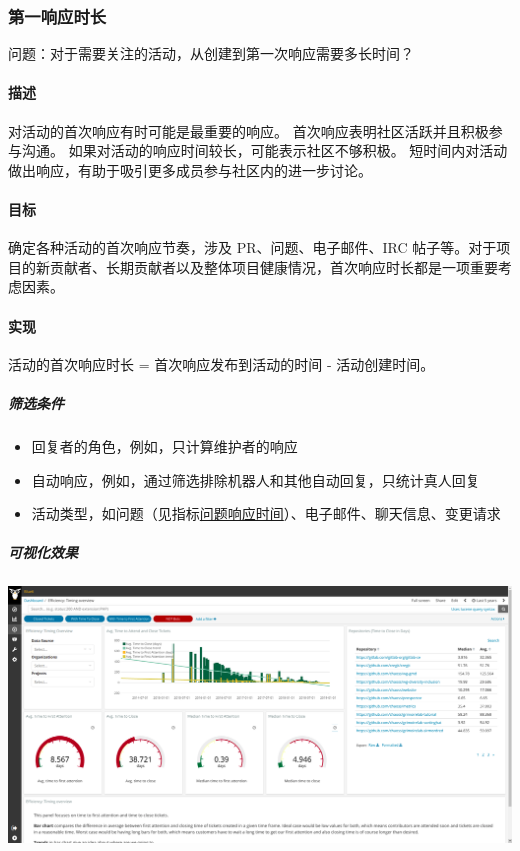 \hypertarget{ux7b2cux4e00ux54cdux5e94ux65f6ux957f}{%
\subsubsection{第一响应时长}\label{ux7b2cux4e00ux54cdux5e94ux65f6ux957f}}

问题：对于需要关注的活动，从创建到第一次响应需要多长时间？

\hypertarget{ux63cfux8ff0}{%
\paragraph{描述}\label{ux63cfux8ff0}}

对活动的首次响应有时可能是最重要的响应。
首次响应表明社区活跃并且积极参与沟通。
如果对活动的响应时间较长，可能表示社区不够积极。
短时间内对活动做出响应，有助于吸引更多成员参与社区内的进一步讨论。

\hypertarget{ux76eeux6807}{%
\paragraph{目标}\label{ux76eeux6807}}

确定各种活动的首次响应节奏，涉及 PR、问题、电子邮件、IRC
帖子等。对于项目的新贡献者、长期贡献者以及整体项目健康情况，首次响应时长都是一项重要考虑因素。

\hypertarget{ux5b9eux73b0}{%
\paragraph{实现}\label{ux5b9eux73b0}}

活动的首次响应时长 = 首次响应发布到活动的时间 - 活动创建时间。

\hypertarget{ux7b5bux9009ux6761ux4ef6}{%
\subparagraph{筛选条件}\label{ux7b5bux9009ux6761ux4ef6}}

\begin{itemize}
\tightlist
\item
  回复者的角色，例如，只计算维护者的响应
\item
  自动响应，例如，通过筛选排除机器人和其他自动回复，只统计真人回复
\item
  活动类型，如问题（见指标\href{https://chaoss.community/metric-issue-response-time/}{问题响应时间}）、电子邮件、聊天信息、变更请求
\end{itemize}

\hypertarget{ux53efux89c6ux5316ux6548ux679c}{%
\subparagraph{可视化效果}\label{ux53efux89c6ux5316ux6548ux679c}}

\includegraphics{images/time-to-first-response_efficiency-timing-overview.png}

